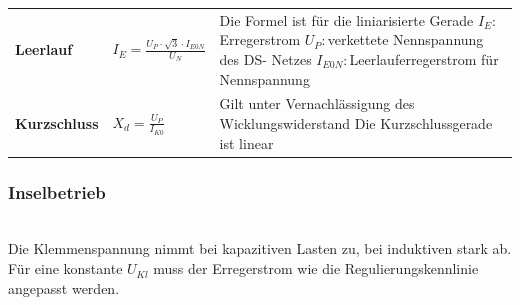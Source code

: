     	\begin{tabular}{ l l p{9cm} }
    		\textbf{Leerlauf}
    		& $I_E = \frac{U_P \cdot \sqrt{3} \cdot I_{E0N}}{U_N}$ 
    		& Die Formel ist für die liniarisierte Gerade \newline
    		  $I_E: $Erregerstrom \newline
    		  $U_P: $verkettete Nennspannung des DS- Netzes\newline
    		  $I_{E0N}:$Leerlauferregerstrom für Nennspannung
    		\\
    		\textbf{Kurzschluss} 
    		& $X_d=\frac{U_P}{I_{K0}}$
    		& Gilt unter Vernachlässigung des Wicklungswiderstand \newline
    		  Die Kurzschlussgerade ist linear
    		\\
    	\end{tabular} 
    	

    \subsubsection{Inselbetrieb}
        \begin{minipage}{10cm}
        \end{minipage}
        \begin{minipage}{6cm}
        \end{minipage} \\
        Die Klemmenspannung nimmt bei kapazitiven Lasten zu, bei induktiven stark ab. Für eine konstante $U_{Kl}$ muss der Erregerstrom wie die Regulierungskennlinie angepasst werden.

